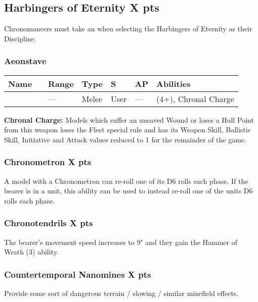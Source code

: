 \subsection[Harbingers of Eternity ]{Harbingers of Eternity  \hrulefill X pts}

Chronomancers must take an  when selecting the Harbingers of Eternity as their Discipline.

\subsubsection{Aeonstave}
\label{Aeonstave}
\noindent
\begin{tabular}{||m{130pt} m{10pt} m{31pt} m{55pt} m{12pt} m{12pt} m{210pt}||}
	\hline
	Name & & Range & Type & S & AP & Abilities \\
	\hline
	\quickref{Aeonstave} & & — & Melee & User & — & \quickref{Entropic Strike} (4+), Chronal Charge \\
	\hline
\end{tabular}
\textbf{Chronal Charge:} Models which suffer an unsaved Wound or loses a Hull Point from this weapon loses the Fleet special rule and has its Weapon Skill, Ballistic Skill, Initiative and Attack values reduced to 1 for the remainder of the game.

\subsubsection[Chronometron ]{Chronometron  \hrulefill X pts}

A model with a Chronometron can re-roll one of its D6 rolls each phase. If the bearer is in a unit, this ability can be used to instead re-roll one of the units D6 rolls each phase.

\subsubsection[Chronotendrils ]{Chronotendrils  \hrulefill X pts}

The bearer's movement speed increases to 9" and they gain the Hammer of Wrath (3) ability.

\subsubsection[Countertemporal Nanomines ]{Countertemporal Nanomines  \hrulefill X pts}

Provide some sort of dangerous terrain / slowing / similar minefield effects. %

